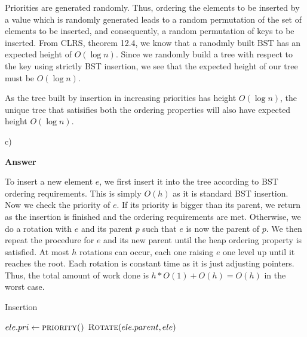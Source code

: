 \documentclass{article}
\begin{document}
Priorities are generated randomly. Thus, ordering the elements to be inserted by a value which is randomly generated
leads to a random permutation of the set of elements to be inserted, and consequently, a random permutation of keys to
be inserted. From CLRS, theorem 12.4, we know that a ranodmly built BST has an expected height of $O(\log n)$. Since we
randomly build a tree with respect to the key using strictly BST insertion, we see that the expected height of our tree
must be $O(\log n)$.

As the tree built by insertion in increasing priorities has height $O(\log n)$, the unique tree that satisifies both the
ordering properties will also have expected height $O(\log n)$.

c)

\textbf{Answer}

To insert a new element $e$, we first insert it into the tree according to BST ordering requirements. This is simply
$O(h)$ as it is standard BST insertion. Now we check the priority of $e$. If its priority is bigger than its parent, we
return as the insertion is finished and the ordering requirements are met.  Otherwise, we do a rotation with $e$ and its
parent $p$ such that $e$ is now the parent of $p$. We then repeat the procedure for $e$ and its new parent until the
heap ordering property is satisfied. At most $h$ rotations can occur, each one raising $e$ one level up until it reaches
the root. Each rotation is constant time as it is just adjusting pointers. Thus, the total amount of work done is $h *
O(1) + O(h) = O(h)$ in the worst case.
\begin{algorithm}
    \caption{Insertion}\label{euclid}
    \begin{algorithmic}[1]
        \State $ele.pri \gets \Call{priority()}{}$
        \State {}
            \State $\Call{Rotate}{ele.parent, ele}$
        \EndProcedure
    \end{algorithmic}
\end{algorithm}
\end{document}
